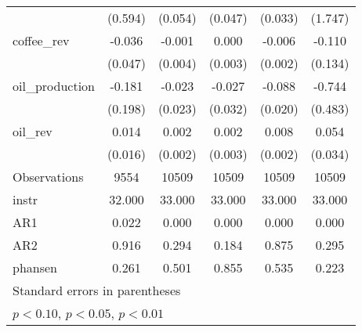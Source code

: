 \begin{table}[htbp]
\begin{tabular}{l*{5}{c}}
                &  (0.594)         &  (0.054)         &  (0.047)         &  (0.033)         &  (1.747)         \\
[1em]
coffee\_rev      &   -0.036         &   -0.001         &    0.000         &   -0.006\sym{**} &   -0.110         \\
                &  (0.047)         &  (0.004)         &  (0.003)         &  (0.002)         &  (0.134)         \\
[1em]
oil\_production  &   -0.181         &   -0.023         &   -0.027         &   -0.088\sym{***}&   -0.744         \\
                &  (0.198)         &  (0.023)         &  (0.032)         &  (0.020)         &  (0.483)         \\
[1em]
oil\_rev         &    0.014         &    0.002         &    0.002         &    0.008\sym{***}&    0.054         \\
                &  (0.016)         &  (0.002)         &  (0.003)         &  (0.002)         &  (0.034)         \\
\hline
Observations    &     9554         &    10509         &    10509         &    10509         &    10509         \\
instr           &   32.000         &   33.000         &   33.000         &   33.000         &   33.000         \\
AR1             &    0.022         &    0.000         &    0.000         &    0.000         &    0.000         \\
AR2             &    0.916         &    0.294         &    0.184         &    0.875         &    0.295         \\
phansen         &    0.261         &    0.501         &    0.855         &    0.535         &    0.223         \\
\hline\hline
\multicolumn{6}{l}{\footnotesize Standard errors in parentheses}\\
\multicolumn{6}{l}{\footnotesize \sym{*} \(p<0.10\), \sym{**} \(p<0.05\), \sym{***} \(p<0.01\)}\\
\end{tabular}
\end{table}
